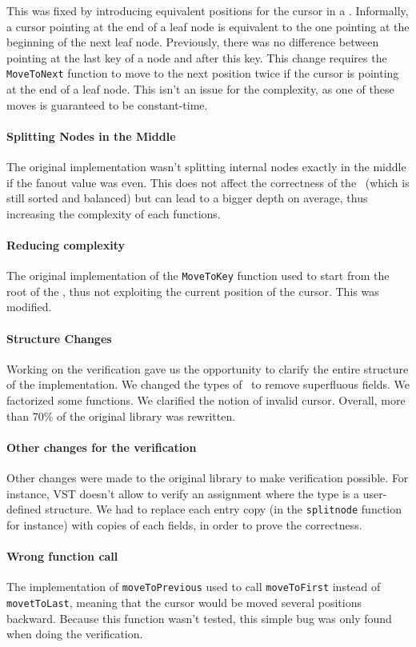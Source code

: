 This was fixed by introducing equivalent positions for the cursor in a \btree.
Informally, a cursor pointing at the end of a leaf node is equivalent to the one pointing at the beginning of the next leaf node.
Previously, there was no difference between pointing at the last key of a node and after this key.
This change requires the \lstinline{MoveToNext} function to move to the next position twice if the cursor is pointing at the end of a leaf node.
This isn't an issue for the complexity, as one of these moves is guaranteed to be constant-time.

\paragraph{Splitting Nodes in the Middle}
The original implementation wasn't splitting internal nodes exactly in the middle if the fanout value was even.
This does not affect the correctness of the \btree\ (which is still sorted and balanced) but can lead to a bigger depth on average, thus increasing the complexity of each functions.

\paragraph{Reducing complexity}
The original implementation of the \lstinline{MoveToKey} function used to start from the root of the \btree, thus not exploiting the current position of the cursor. This was modified.

\paragraph{Structure Changes}
Working on the verification gave us the opportunity to clarify the entire structure of the implementation.
We changed the types of \btrees\ to remove superfluous fields. We factorized some functions. We clarified the notion of invalid cursor.
Overall, more than 70\% of the original library was rewritten.

\paragraph{Other changes for the verification}
Other changes were made to the original library to make verification possible.
For instance, VST doesn't allow to verify an assignment where the type is a user-defined structure. 
We had to replace each entry copy (in the \lstinline{splitnode} function for instance) with copies of each fields, in order to prove the correctness.

\paragraph{Wrong function call} The implementation of \lstinline{moveToPrevious} used to call \lstinline{moveToFirst} instead of \lstinline{movetToLast}, meaning that the cursor would be moved several positions backward.
Because this function wasn't tested, this simple bug was only found when doing the verification.
